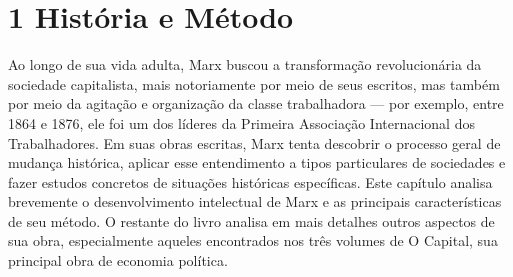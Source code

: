 \chapter{1 História e Método}\label{1 História e Método}
 \par 
Ao longo de sua vida adulta, Marx buscou a transformação revolucionária da sociedade capitalista, mais notoriamente por meio de seus escritos, mas também por meio da agitação e organização da classe trabalhadora — por exemplo, entre 1864 e 1876, ele foi um dos líderes da Primeira Associação Internacional dos Trabalhadores. Em suas obras escritas, Marx tenta descobrir o processo geral de mudança histórica, aplicar esse entendimento a tipos particulares de sociedades e fazer estudos concretos de situações históricas específicas. Este capítulo analisa brevemente o desenvolvimento intelectual de Marx e as principais características de seu método. O restante do livro analisa em mais detalhes outros aspectos de sua obra, especialmente aqueles encontrados nos três volumes de O Capital, sua principal obra de economia política.
 \par 

